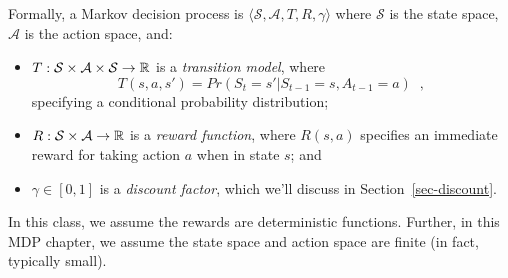 Formally, a Markov decision process is $\langle \mathcal S, \mathcal A, T, R,
  \gamma\rangle$ where $\mathcal{S}$ is the state space, $\mathcal{A}$ is the action space, and:
\begin{itemize}
  \item
        $T : \mathcal S \times \mathcal A \times \mathcal S \rightarrow \mathbb{R}$ is
        a {\em transition model}, where
        \[T(s, a, s') = Pr(S_t = s'|S_{t - 1} = s,
          A_{t - 1} = a)\;\;,\] specifying a conditional probability distribution;
  \item
        $R: \mathcal S \times \mathcal A \rightarrow \mathbb{R}$ is a {\em reward function},
        where $R(s, a)$ specifies an immediate reward for taking action $a$ when
        in state $s$; and
  \item $\gamma \in [0, 1]$ is a {\em discount factor}, which we'll
        discuss in Section~\ref{sec-discount}.
\end{itemize}
In this class, we assume the rewards are deterministic functions. Further, in this MDP chapter, we assume the state space and action space are finite (in fact, typically small).


